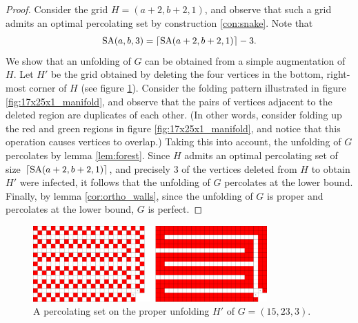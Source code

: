 \begin{proof}
Consider the grid $H=(a+2,b+2,1)$, and observe that such a grid admits an optimal percolating set by construction \ref{con:snake}. Note that
$$\text{SA}(a,b,3) = \lceil\text{SA}(a+2,b+2,1)\rceil - 3.$$
We show that an unfolding of $G$ can be obtained from a simple augmentation of $H$. Let $H'$ be the grid obtained by deleting the four vertices in the bottom, right-most corner of $H$ (see figure \ref{fig:17x25x1_unfolded}). Consider the folding pattern illustrated in figure \ref{fig:17x25x1_manifold}, and observe that the pairs of vertices adjacent to the deleted region are duplicates of each other. (In other words, consider folding up the red and green regions in figure \ref{fig:17x25x1_manifold}, and notice that this operation causes vertices to overlap.) Taking this into account, the unfolding of $G$ percolates by lemma \ref{lem:forest}. Since $H$ admits an optimal percolating set of size $\lceil\text{SA}(a+2,b+2,1)\rceil$, and precisely 3 of the vertices deleted from $H$ to obtain $H'$ were infected, it follows that the unfolding of $G$ percolates at the lower bound. Finally, by lemma \ref{cor:ortho_walls}, since the unfolding of $G$ is proper and percolates at the lower bound, $G$ is perfect.
\end{proof}

\begin{figure}[]
\centering
\includegraphics[width=0.8\textwidth]{figures/7/17x25x1_unfolded.pdf}
\caption{A percolating set on the proper unfolding $H'$ of $G= (15,23,3)$.}
\label{fig:17x25x1_unfolded}
\end{figure}

